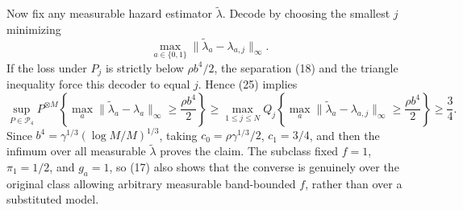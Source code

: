Now fix any measurable hazard estimator \(\widetilde\lambda\). Decode by choosing the smallest \(j\) minimizing
\[
\max_{a\in\{0,1\}}\lVert\widetilde\lambda_a-\lambda_{a,j}\rVert_\infty.
\]
If the loss under \(P_j\) is strictly below \(\rho b^4/2\), the separation (18) and the triangle inequality force this decoder to equal \(j\). Hence (25) implies
\[
\sup_{P\in\mathcal P_4}P^{\otimes M}\!\left\{
\max_a\lVert\widetilde\lambda_a-\lambda_a\rVert_\infty
\ge\frac{\rho b^4}{2}\right\}
\ge\max_{1\le j\le N}Q_j\!\left\{
\max_a\lVert\widetilde\lambda_a-\lambda_{a,j}\rVert_\infty
\ge\frac{\rho b^4}{2}\right\}
\ge\frac34. \tag{26}
\]
Since \(b^4=\gamma^{1/3}(\log M/M)^{1/3}\), taking \(c_0=\rho\gamma^{1/3}/2\), \(c_1=3/4\), and then the infimum over all measurable \(\widetilde\lambda\) proves the claim. The subclass fixed \(f=1\), \(\pi_1=1/2\), and \(g_a=1\), so (17) also shows that the converse is genuinely over the original class allowing arbitrary measurable band-bounded \(f\), rather than over a substituted model.
